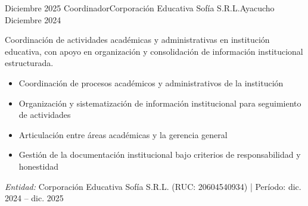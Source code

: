 \experience
{Diciembre 2025} {Coordinador}{Corporación Educativa Sofía S.R.L.}{Ayacucho}
{Diciembre 2024} {
	Coordinación de actividades académicas y administrativas en institución educativa, con apoyo en organización y consolidación de información institucional estructurada.
	\begin{itemize}
		\item Coordinación de procesos académicos y administrativos de la institución
		\item Organización y sistematización de información institucional para seguimiento de actividades
		\item Articulación entre áreas académicas y la gerencia general
		\item Gestión de la documentación institucional bajo criterios de responsabilidad y honestidad
	\end{itemize}
}
{\footnotesize{\emph{Entidad:} Corporación Educativa Sofía S.R.L. (RUC: 20604540934) | Período: dic. 2024 -- dic. 2025}}
